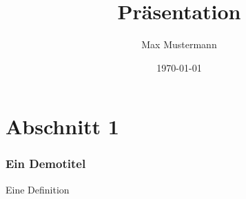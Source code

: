 \documentclass{beamer}
\title{Präsentation}
\author{Max Mustermann}
\date{\today}
\begin{document}
\maketitle
\frame{\tableofcontents[currentsection]}
 
\section{Abschnitt 1}
\begin{frame} %
  \frametitle{Ein Demotitel} %
  \begin{Definition} %
    Eine Definition
  \end{Definition}
\end{frame}
\end{document}
